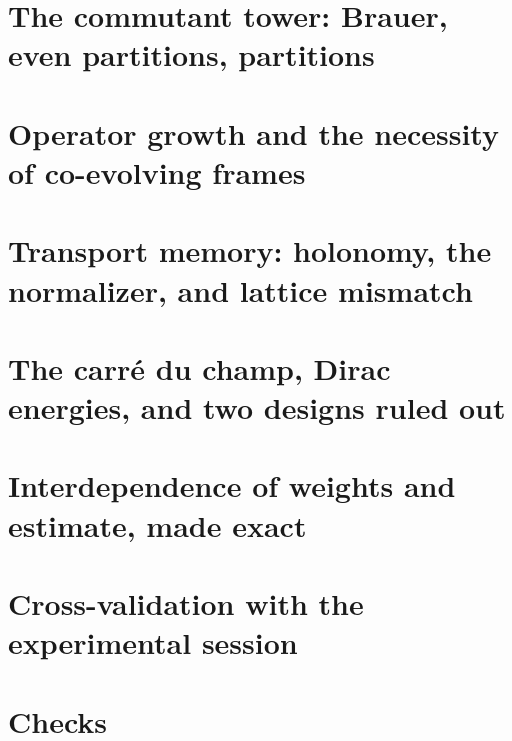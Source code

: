 \documentclass[11pt]{article}
\theoremstyle{plain}
\theoremstyle{definition}\newtheorem{definition}[theorem]{Definition}\newtheorem{remark}[theorem]{Remark}
\begin{document}
\section{The commutant tower: Brauer, even partitions, partitions}

\section{Operator growth and the necessity of co-evolving frames}

\section{Transport memory: holonomy, the normalizer, and lattice mismatch}

\section{The carré du champ, Dirac energies, and two designs ruled out}

\section{Interdependence of weights and estimate, made exact}

\section{Cross-validation with the experimental session}

\section{Checks}

\end{document}
